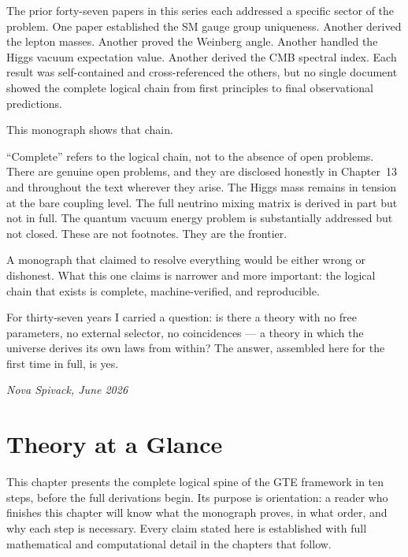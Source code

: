 \documentclass[11pt,openany]{book}
\theoremstyle{remark}
\begin{document}
The prior forty-seven papers in this series each addressed a specific sector of the
problem.
One paper established the SM gauge group uniqueness.
Another derived the lepton masses.
Another proved the Weinberg angle.
Another handled the Higgs vacuum expectation value.
Another derived the CMB spectral index.
Each result was self-contained and cross-referenced the others, but no single document
showed the complete logical chain from first principles to final observational predictions.

This monograph shows that chain.

``Complete'' refers to the logical chain, not to the absence of open problems.
There are genuine open problems, and they are disclosed honestly in Chapter~13 and
throughout the text wherever they arise.
The Higgs mass remains in tension at the bare coupling level.
The full neutrino mixing matrix is derived in part but not in full.
The quantum vacuum energy problem is substantially addressed but not closed.
These are not footnotes.
They are the frontier.

A monograph that claimed to resolve everything would be either wrong or dishonest.
What this one claims is narrower and more important: the logical chain that
exists is complete, machine-verified, and reproducible.

For thirty-seven years I carried a question: is there a theory with no free parameters,
no external selector, no coincidences --- a theory in which the universe derives its own
laws from within?
The answer, assembled here for the first time in full, is yes.

\smallskip
\begin{flushright}
\textit{Nova Spivack, June 2026}
\end{flushright}

\chapter*{Theory at a Glance}
\label{chap:glance}

This chapter presents the complete logical spine of the GTE framework in ten
steps, before the full derivations begin.
Its purpose is orientation: a reader who finishes this chapter will know what
the monograph proves, in what order, and why each step is necessary.
Every claim stated here is established with full mathematical and
computational detail in the chapters that follow.
\end{document}
